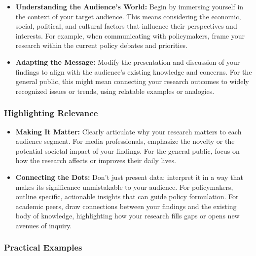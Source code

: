 \documentclass[
]{book}
\providecommand{\tightlist}{%
  \setlength{\itemsep}{0pt}\setlength{\parskip}{0pt}}
\begin{document}
\begin{itemize}
\tightlist
\item
  \textbf{Understanding the Audience's World:} Begin by immersing yourself in the context of your target audience. This means considering the economic, social, political, and cultural factors that influence their perspectives and interests. For example, when communicating with policymakers, frame your research within the current policy debates and priorities.
\item
  \textbf{Adapting the Message:} Modify the presentation and discussion of your findings to align with the audience's existing knowledge and concerns. For the general public, this might mean connecting your research outcomes to widely recognized issues or trends, using relatable examples or analogies.
\end{itemize}

\hypertarget{highlighting-relevance}{%
\subsubsection{Highlighting Relevance}\label{highlighting-relevance}}

\begin{itemize}
\tightlist
\item
  \textbf{Making It Matter:} Clearly articulate why your research matters to each audience segment. For media professionals, emphasize the novelty or the potential societal impact of your findings. For the general public, focus on how the research affects or improves their daily lives.
\item
  \textbf{Connecting the Dots:} Don't just present data; interpret it in a way that makes its significance unmistakable to your audience. For policymakers, outline specific, actionable insights that can guide policy formulation. For academic peers, draw connections between your findings and the existing body of knowledge, highlighting how your research fills gaps or opens new avenues of inquiry.
\end{itemize}

\hypertarget{practical-examples}{%
\subsubsection{Practical Examples}\label{practical-examples}}
\end{document}
